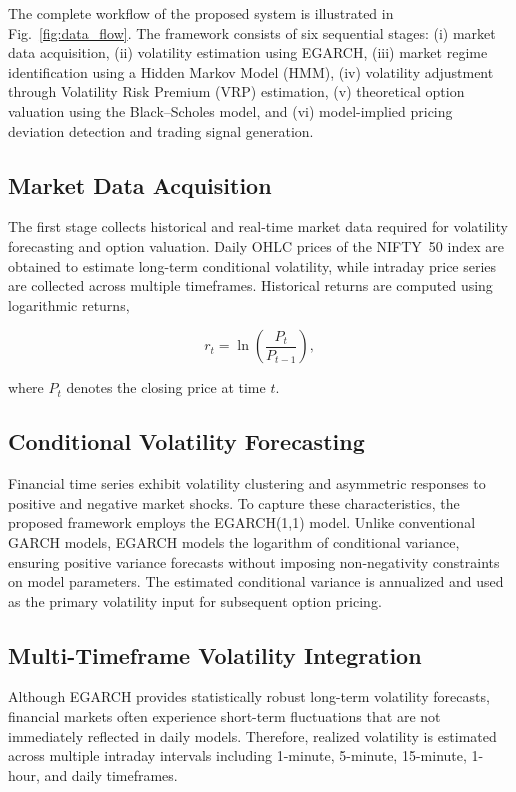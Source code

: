\documentclass[journal]{IEEEtran}
\begin{document}
The complete workflow of the proposed system is illustrated in
Fig.~\ref{fig:data_flow}. The framework consists of six sequential
stages: (i) market data acquisition, (ii) volatility estimation using
EGARCH, (iii) market regime identification using a Hidden Markov Model
(HMM), (iv) volatility adjustment through Volatility Risk Premium
(VRP) estimation, (v) theoretical option valuation using the
Black--Scholes model, and (vi) model-implied pricing deviation
detection and trading signal generation.

\subsection{Market Data Acquisition}

The first stage collects historical and real-time market data required
for volatility forecasting and option valuation. Daily OHLC prices of
the NIFTY~50 index are obtained to estimate long-term conditional
volatility, while intraday price series are collected across multiple
timeframes. Historical returns are computed using logarithmic returns,

\begin{equation}
r_t=\ln\!\left(\frac{P_t}{P_{t-1}}\right),
\end{equation}

where $P_t$ denotes the closing price at time $t$.

\subsection{Conditional Volatility Forecasting}

Financial time series exhibit volatility clustering and asymmetric
responses to positive and negative market shocks. To capture these
characteristics, the proposed framework employs the EGARCH(1,1) model.
Unlike conventional GARCH models, EGARCH models the logarithm of
conditional variance, ensuring positive variance forecasts without
imposing non-negativity constraints on model parameters. The estimated
conditional variance is annualized and used as the primary volatility
input for subsequent option pricing.

\subsection{Multi-Timeframe Volatility Integration}

Although EGARCH provides statistically robust long-term volatility
forecasts, financial markets often experience short-term fluctuations
that are not immediately reflected in daily models. Therefore, realized
volatility is estimated across multiple intraday intervals including
1-minute, 5-minute, 15-minute, 1-hour, and daily timeframes.
\end{document}
